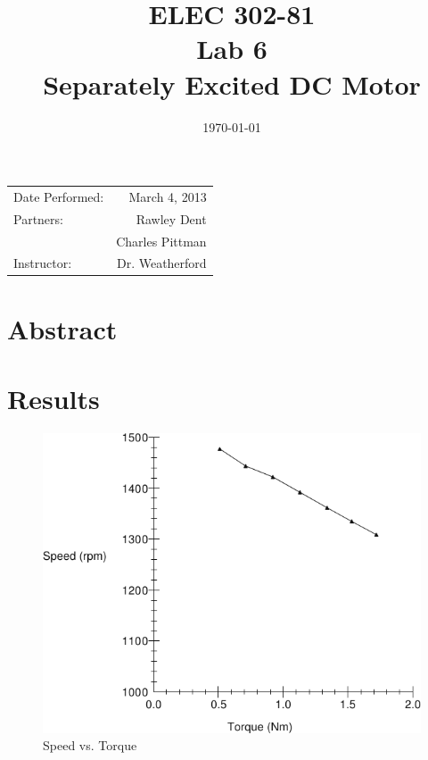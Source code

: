 \documentclass{article}
\author{}
\title{ELEC 302-81\\ Lab 6\\ Separately Excited DC Motor}
\date{\today}
\begin{document}
\maketitle

\begin{center}
  \begin{tabular}{lr}
    Date Performed: & March 4, 2013 \\
    Partners: & Rawley Dent \\
              & Charles Pittman \\
    Instructor: & Dr. Weatherford
  \end{tabular}
\end{center}

\pagebreak


\section{Abstract}


\section{Results}

\begin{figure}[H]
  \centering
  \includegraphics[width=\textwidth]{img/plot4}
  \caption{Speed vs. Torque}
  \label{fig:plot4}
\end{figure}
\end{document}
